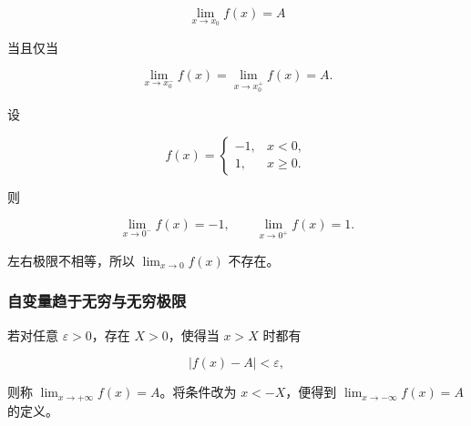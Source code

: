 \documentclass[fontset=fandol]{ctexart}
\begin{document}
\begin{theorem}[双侧极限存在的充要条件]

\[

\lim_{x\to x_0}f(x)=A

\]

当且仅当

\[

\lim_{x\to x_0^-}f(x)=\lim_{x\to x_0^+}f(x)=A.

\]

\end{theorem}



\begin{example}[左右极限不相等]

设

\[

f(x)=

\begin{cases}

-1,&x<0,\\

1,&x\geq0.

\end{cases}

\]

则

\[

\lim_{x\to0^-}f(x)=-1,\qquad

\lim_{x\to0^+}f(x)=1.

\]

左右极限不相等，所以 \(\lim_{x\to0}f(x)\) 不存在。

\end{example}



\subsubsection*{自变量趋于无穷与无穷极限}



\begin{definition}[自变量趋于无穷时的有限极限]

若对任意 \(\varepsilon>0\)，存在 \(X>0\)，使得当 \(x>X\) 时都有

\[

|f(x)-A|<\varepsilon,

\]

则称 \(\lim_{x\to+\infty}f(x)=A\)。将条件改为 \(x<-X\)，便得到 \(\lim_{x\to-\infty}f(x)=A\) 的定义。

\end{definition}
\end{document}
